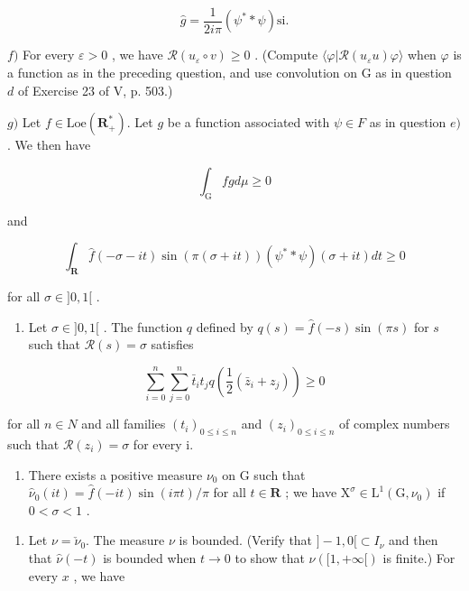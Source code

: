 \[
\widehat {g} = \frac {1}{2 i \pi} (\psi^ {*} * \psi) \mathrm{si}.
\]

\(f)\) For every \(\varepsilon > 0\) , we have \(\mathcal{R}(u_{\varepsilon} \circ v) \geqslant 0\) . (Compute \(\langle \varphi | \mathcal{R}(u_{\varepsilon} u) \varphi \rangle\) when \(\varphi\) is a function as in the preceding question, and use convolution on G as in question \(d\) of Exercise 23 of V, p. 503.)

\(g)\) Let \(f \in \mathrm{Loe}(\mathbf{R}_{+}^{*})\). Let \(g\) be a function associated with \(\psi \in F\) as in question \(e)\). We then have

\[
\int_ {\mathrm{G}} f g d \mu \geqslant 0
\]

and

\[
\int_ {\mathbf {R}} \widehat {f} (- \sigma - i t) \sin (\pi (\sigma + i t)) (\psi^ {*} * \psi) (\sigma + i t) d t \geqslant 0
\]

for all \(\sigma\in]0,1[\) .

\begin{enumerate}
\def\labelenumi{\alph{enumi})}
\setcounter{enumi}{7}
\tightlist
\item
  Let \(\sigma \in ]0,1[\) . The function \(q\) defined by \(q(s) = \widehat{f}(-s)\sin(\pi s)\) for \(s\) such that \(\mathcal{R}(s) = \sigma\) satisfies
\end{enumerate}

\[
\sum_ {i = 0} ^ {n} \sum_ {j = 0} ^ {n} \bar {t} _ {i} t _ {j} q \left(\frac {1}{2} (\bar {z} _ {i} + z _ {j})\right) \geqslant 0
\]

for all \(n \in N\) and all families \((t_{i})_{0 \leqslant i \leqslant n}\) and \((z_{i})_{0 \leqslant i \leqslant n}\) of complex numbers such that \(\mathcal{R}(z_{i}) = \sigma\) for every i.

\begin{enumerate}
\def\labelenumi{\roman{enumi})}
\tightlist
\item
  There exists a positive measure \(\nu_0\) on G such that \(\widehat{\nu}_0(it) = \widehat{f}(-it)\sin(i\pi t)/\pi\) for all \(t\in\mathbf{R}\) ; we have \(\mathrm{X}^{\sigma}\in\mathrm{L}^{1}(\mathrm{G},\nu_{0})\) if \(0<\sigma<1\) .
\end{enumerate}

\begin{enumerate}
\def\labelenumi{\alph{enumi})}
\setcounter{enumi}{9}
\tightlist
\item
  Let \(\nu = \check{\nu}_0\). The measure \(\nu\) is bounded. (Verify that \(]-1,0[ \subset I_{\nu}\) and then that \(\widehat{\nu}(-t)\) is bounded when \(t \to 0\) to show that \(\nu([1,+\infty[)\) is finite.) For every \(x\) , we have
\end{enumerate}

